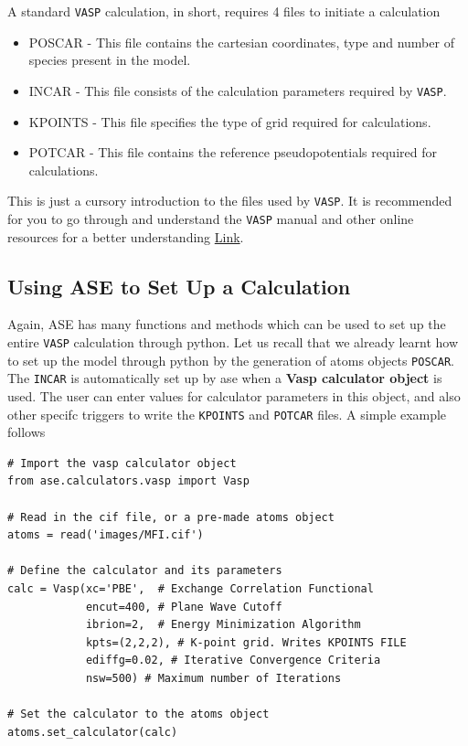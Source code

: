 \documentclass[11pt]{article}
\begin{document}
A standard \texttt{VASP} calculation, in short, requires 4 files to initiate a calculation
\begin{itemize}
\item POSCAR - This file contains the cartesian coordinates, type and number of species present in the model.
\item INCAR - This file consists of the calculation parameters required by \texttt{VASP}.
\item KPOINTS - This file specifies the type of grid required for calculations.
\item POTCAR - This file contains the reference pseudopotentials required for calculations.
\end{itemize}

This is just a cursory introduction to the files used by \texttt{VASP}. It is recommended for you to go through and understand the \texttt{VASP} manual and other online resources for a better understanding \href{https://www.vasp.at/index.php/documentation}{Link}. 

\subsection{Using ASE to Set Up a Calculation}
\label{sec-4-2}
Again, ASE has many functions and methods which can be used to set up the entire \texttt{VASP} calculation through python. Let us recall that we already learnt how to set up the model through python by the generation of atoms objects \texttt{POSCAR}. The \texttt{INCAR} is automatically set up by ase when a \textbf{Vasp calculator object} is used. The user can enter values for calculator parameters in this object, and also other specifc triggers to write the \texttt{KPOINTS} and \texttt{POTCAR} files. A simple example follows

\begin{verbatim}
# Import the vasp calculator object
from ase.calculators.vasp import Vasp

# Read in the cif file, or a pre-made atoms object
atoms = read('images/MFI.cif')

# Define the calculator and its parameters
calc = Vasp(xc='PBE',  # Exchange Correlation Functional
            encut=400, # Plane Wave Cutoff
            ibrion=2,  # Energy Minimization Algorithm
            kpts=(2,2,2), # K-point grid. Writes KPOINTS FILE
            ediffg=0.02, # Iterative Convergence Criteria
            nsw=500) # Maximum number of Iterations

# Set the calculator to the atoms object
atoms.set_calculator(calc)
\end{verbatim}
\end{document}
